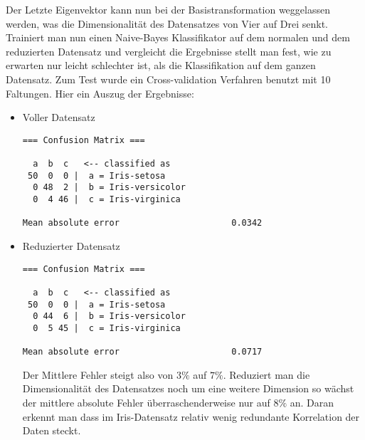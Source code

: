 \documentclass[a4paper]{article}
\begin{document}
Der Letzte Eigenvektor kann nun bei der Basistransformation weggelassen werden, was die Dimensionalität des Datensatzes von Vier auf Drei senkt.\\
Trainiert man nun einen Naive-Bayes Klassifikator auf dem normalen und dem reduzierten Datensatz und vergleicht die Ergebnisse stellt man fest, wie zu erwarten nur leicht schlechter ist, als die Klassifikation auf dem ganzen Datensatz. Zum Test wurde ein Cross-validation Verfahren benutzt mit 10 Faltungen. Hier ein Auszug der Ergebnisse:
\begin{itemize}
\item Voller Datensatz
\begin{lstlisting}
=== Confusion Matrix ===

  a  b  c   <-- classified as
 50  0  0 |  a = Iris-setosa
  0 48  2 |  b = Iris-versicolor
  0  4 46 |  c = Iris-virginica
  
Mean absolute error                      0.0342
\end{lstlisting}
\item Reduzierter Datensatz
\begin{lstlisting}
=== Confusion Matrix ===

  a  b  c   <-- classified as
 50  0  0 |  a = Iris-setosa
  0 44  6 |  b = Iris-versicolor
  0  5 45 |  c = Iris-virginica
  
Mean absolute error                      0.0717
\end{lstlisting}
Der Mittlere Fehler steigt also von $3\%$ auf $7\%$. Reduziert man die Dimensionalität des Datensatzes noch um eine weitere Dimension so wächst der mittlere absolute Fehler überraschenderweise nur auf $8\%$ an. Daran erkennt man dass im Iris-Datensatz relativ wenig redundante Korrelation der Daten steckt.
\end{itemize}
\end{document}
